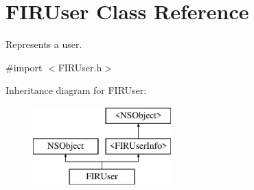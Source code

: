 \hypertarget{interface_f_i_r_user}{}\section{F\+I\+R\+User Class Reference}
\label{interface_f_i_r_user}


Represents a user.  




{\ttfamily \#import $<$F\+I\+R\+User.\+h$>$}

Inheritance diagram for F\+I\+R\+User\+:\begin{figure}[H]
\begin{center}
\leavevmode
\includegraphics[height=3.000000cm]{interface_f_i_r_user}
\end{center}
\end{figure}

